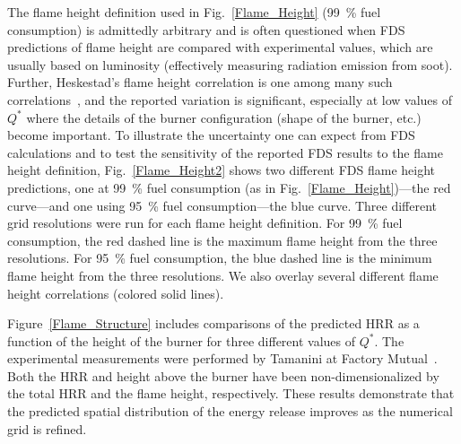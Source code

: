 The flame height definition used in Fig.~\ref{Flame_Height} (99~\% fuel consumption) is admittedly arbitrary and is often questioned when FDS predictions of flame height are compared with experimental values, which are usually based on luminosity (effectively measuring radiation emission from soot).  Further, Heskestad's flame height correlation is one among many such correlations~\cite{SFPE:Heskestad,Steward:1970,Becker:1978,Cox:1985,Hasemi:1984,Cetegen:1984,Delichatsios:1984}, and the reported variation is significant, especially at low values of $Q^*$ where the details of the burner configuration (shape of the burner, etc.) become important.  To illustrate the uncertainty one can expect from FDS calculations and to test the sensitivity of the reported FDS results to the flame height definition, Fig.~\ref{Flame_Height2} shows two different FDS flame height predictions, one at 99~\% fuel consumption (as in Fig.~\ref{Flame_Height})---the red curve---and one using 95~\% fuel consumption---the blue curve.  Three different grid resolutions were run for each flame height definition.  For 99~\% fuel consumption, the red dashed line is the maximum flame height from the three resolutions.  For 95~\% fuel consumption, the blue dashed line is the minimum flame height from the three resolutions.  We also overlay several different flame height correlations (colored solid lines).

Figure~\ref{Flame_Structure} includes comparisons of the predicted HRR as a function of the height of the burner for three different values of $Q^*$. The experimental measurements were performed by Tamanini at Factory Mutual~\cite{Tamanini:CF1983}. Both the HRR and height above the burner have been non-dimensionalized by the total HRR and the flame height, respectively. These results demonstrate that the predicted spatial distribution of the energy release improves as the numerical grid is refined.

\clearpage

